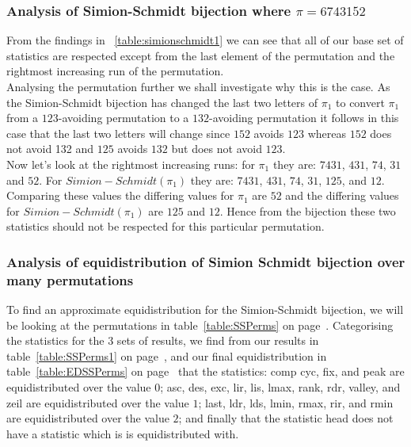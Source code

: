 \documentclass[12pt]{article}
\begin{document}
\subsubsection{Analysis of Simion-Schmidt bijection where $\pi = 6743152$}
From the findings in ~\ref{table:simionschmidt1} we can see that all of our base set of statistics are respected except from the last element of the permutation and the rightmost increasing run of the permutation.\\
Analysing the permutation further we shall investigate why this is the case. As the Simion-Schmidt bijection has changed the last two letters of $\pi_1$ to convert $\pi_1$ from a $123$-avoiding permutation to a $132$-avoiding permutation it follows in this case that the last two letters will change since $152$ avoids $123$ whereas $152$ does not avoid 132 and $125$ avoids $132$ but does not avoid $123$.\\
Now let's look at the rightmost increasing runs: for $\pi_1$ they are: $7431$, $431$, $74$, $31$ and $52$. For $Simion-Schmidt(\pi_1)$ they are:  $7431$, $431$, $74$, $31$, $125$, and $12$. Comparing these values the differing values for $\pi_1$ are $52$ and the differing values for $Simion-Schmidt(\pi_1)$ are $125$ and $12$. Hence from the bijection these two statistics should not be respected for this particular permutation. 
\subsubsection{Analysis of equidistribution of Simion Schmidt bijection over many permutations}
To find an approximate equidistribution for the Simion-Schmidt bijection, we will be looking at the permutations in table~\ref{table:SSPerms} on page~\pageref{table:SSPerms}. Categorising the statistics for the 3 sets of results, we find from our results in table~\ref{table:SSPerms1} on page~\pageref{table:SSPerms1}, and our final equidistribution in table~\ref{table:EDSSPerms} on page~\pageref{table:EDSSPerms} that the statistics: comp cyc, fix, and peak are equidistributed over the value $0$; asc, des, exc, lir, lis, lmax, rank, rdr, valley, and zeil are equidistributed over the value $1$; last, ldr, lds, lmin, rmax, rir, and rmin are equidistributed over the value $2$; and finally that the statistic head does not have a statistic which is is equidistributed with.
\end{document}
